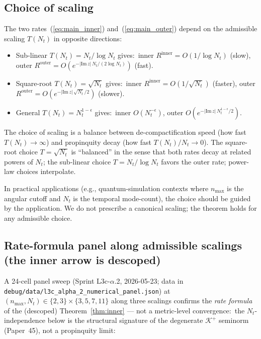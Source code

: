 \documentclass[11pt,a4paper]{article}
\theoremstyle{plain}
\theoremstyle{definition}
\newcommand{\nmax}{n_{\max}}
\newcommand{\Nt}{N_{t}}
\newcommand{\Krein}{\mathcal{K}}
\newcommand{\Kplus}{\Krein^{+}}
\begin{document}
\subsection{Choice of scaling}\label{sec:composite_two_rate}

The two rates~(\ref{eq:main_inner}) and~(\ref{eq:main_outer}) depend
on the admissible scaling $T(\Nt)$ in opposite directions:
\begin{itemize}
\item Sub-linear $T(\Nt) = \Nt/\log\Nt$ gives:\ inner
$R^{\mathrm{inner}} = O(1/\log\Nt)$ (slow), outer
$R^{\mathrm{outer}} = O(e^{-|\mathrm{Im}\,z|\,\Nt/(2\log\Nt)})$ (fast).
\item Square-root $T(\Nt) = \sqrt{\Nt}$ gives:\ inner
$R^{\mathrm{inner}} = O(1/\sqrt{\Nt})$ (faster), outer
$R^{\mathrm{outer}} = O(e^{-|\mathrm{Im}\,z|\,\sqrt{\Nt}/2})$ (slower).
\item General $T(\Nt) = \Nt^{1-\epsilon}$ gives:\ inner $O(\Nt^{-\epsilon})$,
outer $O(e^{-|\mathrm{Im}\,z|\,\Nt^{1-\epsilon}/2})$.
\end{itemize}
The choice of scaling is a balance between de-compactification speed
(how fast $T(\Nt) \to \infty$) and propinquity decay (how fast
$T(\Nt)/\Nt \to 0$). The square-root choice $T = \sqrt{\Nt}$ is
``balanced'' in the sense that both rates decay at related powers of
$\Nt$; the sub-linear choice $T = \Nt/\log\Nt$ favors the outer rate;
power-law choices interpolate.

In practical applications (e.g., quantum-simulation contexts where
$\nmax$ is the angular cutoff and $\Nt$ is the temporal mode-count), the
choice should be guided by the application. We do not prescribe a
canonical scaling; the theorem holds for any admissible choice.

\subsection{Rate-formula panel along admissible scalings (the inner
arrow is descoped)}\label{sec:numerical_panel}

A 24-cell panel sweep
(Sprint L3c-$\alpha$.2, 2026-05-23; data in
\texttt{debug/data/l3c\_alpha\_2\_numerical\_panel.json}) at
$(\nmax, \Nt) \in \{2, 3\} \times \{3, 5, 7, 11\}$ along three
scalings confirms the \emph{rate formula} of the (descoped)
Theorem~\ref{thm:inner} --- not a metric-level convergence:\ the
$\Nt$-independence below is the structural signature of the degenerate
$\Kplus$ seminorm (Paper~45), not a propinquity limit:
\end{document}
